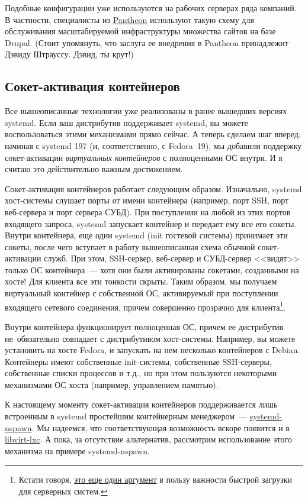 \documentclass[10pt,oneside,a4paper]{article}
\begin{document}
Подобные конфигурации уже используются на рабочих серверах ряда компаний. В
частности, специалисты из \href{https://www.getpantheon.com/}{Pantheon}
используют такую схему для обслуживания масштабируемой инфраструктуры множества
сайтов на базе Drupal. (Стоит упомянуть, что заслуга ее внедрения в Pantheon
принадлежит Дэвиду Штрауссу. Дэвид, ты крут!)

\subsection{Сокет-активация контейнеров}

Все вышеописанные технологии уже реализованы в ранее вышедших версиях systemd.
Если ваш дистрибутив поддерживает systemd, вы можете воспользоваться этими
механизмами прямо сейчас. А теперь сделаем шаг вперед: начиная с
systemd 197 (и, соответственно, с Fedora~19), мы добавили поддержку
сокет-активации \emph{виртуальных контейнеров} с полноценными ОС внутри. И
я считаю это действительно важным достижением.

Сокет-активация контейнеров работает следующим образом. Изначально, systemd
хост-системы слушает порты от имени контейнера (например, порт SSH, порт
веб-сервера и порт сервера СУБД). При поступлении на любой из этих портов
входящего запроса, systemd запускает контейнер и передает ему все его сокеты.
Внутри контейнера, еще один systemd (init гостевой системы) принимает эти
сокеты, после чего вступает в работу вышеописанная схема обычной сокет-активации
служб. При этом, SSH-сервер, веб-сервер и СУБД-сервер <<видят>> только ОС
контейнера~--- хотя они были активированы сокетами, созданными на хосте! Для
клиента все эти тонкости скрыты. Таким образом, мы получаем виртуальный
контейнер с собственной ОС, активируемый при поступлении входящего сетевого
соединения, причем совершенно прозрачно для клиента\footnote{Кстати говоря,
\href{https://plus.google.com/115547683951727699051/posts/cVrLAJ8HYaP}{это еще
один аргумент} в пользу важности быстрой загрузки для серверных систем.}.

Внутри контейнера функционирует полноценная ОС, причем ее дистрибутив
не~обязательно совпадает с дистрибутивом хост-системы. Например, вы можете
установить на хосте Fedora, и запускать на нем несколько контейнеров с Debian.
Контейнеры имеют собственные init-системы, собственные SSH-серверы, собственные
списки процессов и т.д., но при этом пользуются некоторыми механизмами ОС хоста
(например, управлением памятью).

К настоящему моменту сокет-активация контейнеров поддерживается лишь встроенным
в systemd простейшим контейнерным менеджером~---
\hyperref[sec:chroots]{systemd-nspawn}. Мы надеемся, что соответствующая
возможность вскоре появится и в
\href{http://libvirt.org/drvlxc.html}{libvirt-lxc}. А пока, за отсутствие
альтернатив, рассмотрим использование этого механизма на примере systemd-nspawn.
\end{document}
